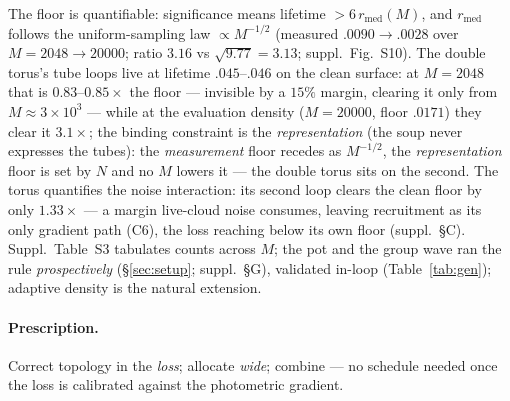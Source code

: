 The floor is quantifiable: significance means lifetime
$> 6\,r_{\mathrm{med}}(M)$, and $r_{\mathrm{med}}$ follows the
uniform-sampling law $\propto M^{-1/2}$ (measured $.0090{\to}.0028$
over $M{=}2048{\to}20000$; ratio $3.16$ vs $\sqrt{9.77}{=}3.13$;
suppl.\ Fig.~S10). The
double torus's tube loops live at lifetime $.045$--$.046$ on the clean
surface: at $M{=}2048$ that is $0.83$--$0.85\times$ the floor --- invisible
by a $15\%$ margin, clearing it only from $M\!\approx\!3{\times}10^{3}$ ---
while at the evaluation density ($M{=}20000$, floor $.0171$) they clear
it $3.1\times$; the binding constraint is the \emph{representation}
(the soup never expresses the tubes): the \emph{measurement} floor
recedes as $M^{-1/2}$, the \emph{representation} floor is set by $N$
and no $M$ lowers it --- the double torus sits on the second. The torus quantifies the noise interaction: its second loop clears the
clean floor by only $1.33\times$ --- a margin live-cloud noise consumes,
leaving recruitment as its only gradient path (C6), the loss reaching
below its own floor (suppl.\ \S C).
Suppl.\ Table~S3 tabulates counts across $M$; the pot and the group
wave ran the rule \emph{prospectively} (\S\ref{sec:setup}; suppl.\
\S G), validated in-loop (Table~\ref{tab:gen}); adaptive density is the
natural extension.

\paragraph{Prescription.} Correct topology in the \emph{loss}; allocate
\emph{wide}; combine --- no schedule needed once the loss is calibrated
against the photometric gradient.

